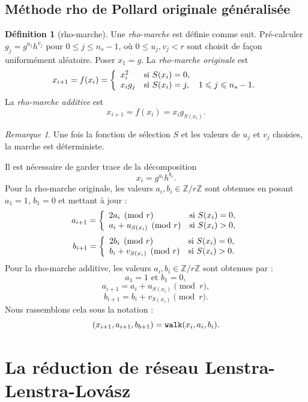 \documentclass[a4paper, titlepage]{article}
\theoremstyle{definition}
\newtheorem{defi}[theo]{Définition}
\theoremstyle{remark}
\newtheorem{rema}[theo]{Remarque}
\def\Z{\mathbb Z}
\begin{document}
\subsection{Méthode rho de Pollard originale généralisée}

\begin{defi}[rho-marche]
Une \textit{rho-marche} est définie comme suit. Pré-calculer $g_j = g^{u_j}h^{v_j}$ pour $0 \leqslant j \leqslant n_s -1$, où $ 0\leqslant u_j, v_j < r$ sont choisit de façon uniformément aléatoire. Poser $x_1 = g$. La \textit{rho-marche originale} est 
$$x_{i+1} = f(x_i) = \left\{ \begin{array}{l l}
x_i^2 & \text{si } S(x_i) = 0,\\
x_ig_j & \text{si } S(x_i) = j, \quad 1 \leqslant j \leqslant n_s-1.
\end{array} \right.$$
La \textit{rho-marche additive} est
$$x_{i+1} = f(x_i) = x_ig_{S(x_i)}.$$
\end{defi}

\begin{rema}
Une fois la fonction de sélection $S$ et les valeurs de $u_j$ et $v_j$ choisies, la marche est déterministe.
\end{rema}

Il est nécessaire de garder trace de la décomposition 
$$x_i = g^{a_i}h^{b_i}.$$ 
Pour la rho-marche originale, les valeurs $a_i, b_i \in \Z/r\Z$ sont obtenues en posant $a_1 = 1$, $b_1 = 0$ et mettant à jour :
$$a_{i+1} = \left\{\begin{array}{l l}
2a_i \pmod{r} & \text{si } S(x_i) = 0, \\
a_i + u_{S(x_i)} \pmod{r} & \text{si } S(x_i) > 0, \\
\end{array}\right.$$
$$b_{i+1} = \left\{\begin{array}{l l}
2b_i \pmod{r} & \text{si } S(x_i) = 0, \\
b_i + v_{S(x_i)} \pmod{r} & \text{si } S(x_i) > 0. \\
\end{array}\right.$$
Pour la rho-marche additive, les valeurs $a_i, b_i \in \Z/r\Z$ sont obtenues par :
$$a_1 = 1\text{ et } b_1 = 0,$$
$$a_{i+1} = a_i + u_{S(x_i)} \pmod{r}, $$
$$b_{i+1} = 
b_i + v_{S(x_i)} \pmod{r}.$$
Nous rassemblons cela sous la notation :
$$(x_{i+1}, a_{i+1}, b_{b+1}) = \verb|walk| (x_i, a_i, b_i).$$

\section{La réduction de réseau Lenstra-Lenstra-Lov\'asz}
\end{document}
